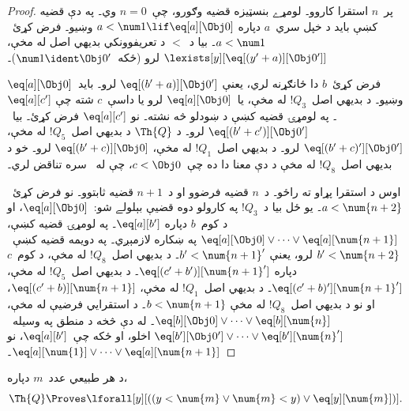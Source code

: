 \documentclass[../../../include/open-logic-section]{subfiles}
\begin{document}
\begin{proof}
پر~$n$ استقرا کاروو۔ لومړے بنسټيزه قضيه وګورو، چې~$n = 0$ وي۔ په
دې قضيه کښې بايد د خپل سري~$a$ دپاره
$a < \num 1 \lif \eq[a][\Obj 0]$ وښيو۔ فرض کړئ~$a < \num 1$۔ بيا
د~$<$ د تعريفوونکي بديهي اصل له مخې،
$\lexists[y][\eq[(y'+a)][\Obj 0']]$ لرو (ځکه~$\num 1 \ident
\Obj 0'$)۔

فرض کړئ~$b$ دا ځانګړنه لري، يعنې
$\eq[(b'+a)][\Obj 0']$ لرو۔ بايد~$\eq[a][\Obj 0]$ وښيو۔ د بديهي
اصل~$!Q_3$ له مخې، يا~$\eq[a][\Obj 0]$ لرو يا داسې~$c$ شته چې
$\eq[a][c']$۔ په لومړۍ قضيه کښې د ښودلو څه نشته۔ نو
$\eq[a][c']$ فرض کړئ۔ بيا~$\eq[(b' + c')][\Obj 0']$ لرو۔ د
$\Th{Q}$ د بديهي اصل~$!Q_5$ له مخې،
$\eq[(b'+c)'][\Obj 0']$ لرو۔ د بديهي اصل~$!Q_1$ له مخې،
$\eq[(b' + c)][\Obj 0]$ لرو۔ خو د بديهي اصل~$!Q_8$ له مخې د دې معنا
دا ده چې~$c < \Obj 0$، چې له~ سره تناقض لري۔

اوس د استقرا پړاو ته راځو۔ د~$n$ قضيه فرضوو او د~$n+1$ قضيه
ثابتوو۔ نو فرض کړئ~$a < \num {n+2}$۔ يو ځل بيا د~$!Q_3$ په کارولو
دوه قضيې بېلولے شو:~$\eq[a][\Obj 0]$، او د کوم~$b$ دپاره
$\eq[a][b']$۔ په لومړۍ قضيه کښې،
$\eq[a][\Obj 0] \lor \dots \lor \eq[a][\num{n+1}]$ په ښکاره لازمېږي۔
په دويمه قضيه کښې~$b' < \num {n+2}$ لرو، يعنې
$b' < \num{n+1}'$۔ د بديهي اصل~$!Q_8$ له مخې، د کوم~$c$ دپاره
$\eq[(c'+b')][\num{n+1}']$۔ د بديهي اصل~$!Q_5$ له مخې،
$\eq[(c'+b)'][\num{n+1}']$۔ د بديهي اصل~$!Q_1$ له مخې،
$\eq[(c'+b)][\num{n+1}]$، او نو د بديهي اصل~$!Q_8$ له مخې
$b < \num{n+1}$۔ د استقرايي فرضيې له مخې،
$\eq[b][\Obj 0] \lor \dots \lor \eq[b][\num{n}]$۔ له دې څخه د منطق
په وسيله~$\eq[b'][\Obj 0'] \lor \dots \lor \eq[b'][\num{n}']$ اخلو،
او ځکه چې~$\eq[a][b']$، نو
$\eq[a][\num{1}] \lor \dots \lor \eq[a][\num{n+1}]$۔
\end{proof}

\begin{lem}
   د هر طبيعي عدد~$m$ دپاره،
  \[
  \Th{Q} \Proves
  \lforall[y][((y < \num{m} \lor \num{m} < y) \lor \eq[y][\num{m}])].
  \]
\end{lem}
\end{document}
